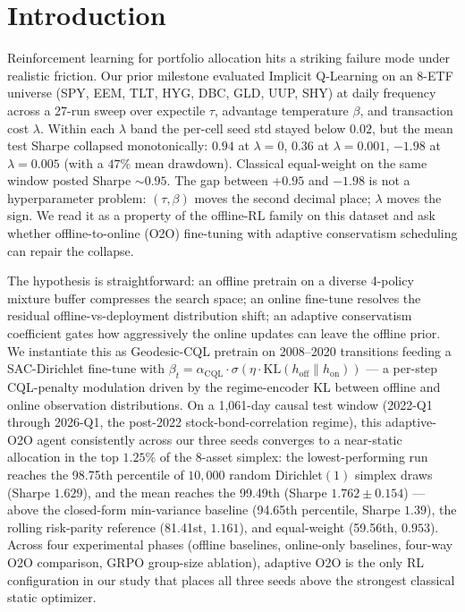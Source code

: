 
\section{Introduction}
\label{sec:intro}

Reinforcement learning for portfolio allocation hits a striking
failure mode under realistic friction. Our prior milestone evaluated
Implicit Q-Learning on an 8-ETF universe (SPY, EEM, TLT, HYG, DBC,
GLD, UUP, SHY) at daily frequency across a 27-run sweep over expectile
$\tau$, advantage temperature $\beta$, and transaction cost $\lambda$.
Within each $\lambda$ band the per-cell seed std stayed below $0.02$,
but the mean test Sharpe collapsed monotonically: $0.94$ at
$\lambda{=}0$, $0.36$ at $\lambda{=}0.001$, $-1.98$ at $\lambda{=}0.005$
(with a $47\%$ mean drawdown). Classical equal-weight on the same
window posted Sharpe $\sim 0.95$. The gap between $+0.95$ and $-1.98$
is not a hyperparameter problem: $(\tau, \beta)$ moves the second
decimal place; $\lambda$ moves the sign. We read it as a property of
the offline-RL family on this dataset and ask whether offline-to-online
(O2O) fine-tuning with adaptive conservatism scheduling can repair the
collapse.

The hypothesis is straightforward: an offline pretrain on a diverse
4-policy mixture buffer compresses the search space; an online
fine-tune resolves the residual offline-vs-deployment distribution
shift; an adaptive conservatism coefficient gates how aggressively the
online updates can leave the offline prior. We instantiate this as
Geodesic-CQL pretrain on 2008--2020 transitions feeding a
SAC-Dirichlet fine-tune with $\beta_t = \alpha_{\mathrm{CQL}} \cdot
\sigma(\eta \cdot \mathrm{KL}(h_{\mathrm{off}} \| h_{\mathrm{on}}))$
--- a per-step CQL-penalty modulation driven by the regime-encoder KL
between offline and online observation distributions. On a 1{,}061-day
causal test window (2022-Q1 through 2026-Q1, the post-2022
stock-bond-correlation regime), this adaptive-O2O agent consistently
across our three seeds converges to a near-static allocation in the
top $1.25\%$ of the 8-asset simplex: the lowest-performing run reaches
the 98.75th percentile of $10{,}000$ random Dirichlet$(1)$ simplex
draws (Sharpe $1.629$), and the mean reaches the 99.49th
(Sharpe $1.762 \pm 0.154$) --- above the closed-form min-variance
baseline (94.65th percentile, Sharpe $1.39$), the rolling risk-parity
reference (81.41st, $1.161$), and equal-weight (59.56th, $0.953$).
Across four experimental phases (offline baselines, online-only
baselines, four-way O2O comparison, GRPO group-size ablation),
adaptive O2O is the only RL configuration in our study that places
all three seeds above the strongest classical static optimizer.

